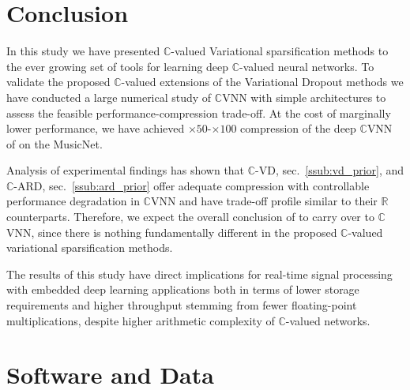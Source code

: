 \documentclass[a4paper,10pt,twocolumn]{article}
\newcommand{\real}{\mathbb{R}}
\newcommand{\cplx}{\mathbb{C}}
\begin{document}


\section{Conclusion} %
\label{sec:conclusion}

In this study we have presented $\cplx$-valued Variational sparsification methods to
the ever growing set of tools for learning deep $\cplx$-valued neural networks. To
validate the proposed $\cplx$-valued extensions of the Variational Dropout methods
\citep{molchanov_variational_2017,kharitonov_variational_2018} we have conducted a
large numerical study of $\cplx$VNN with simple architectures to assess the feasible
performance-compression trade-off. At the cost of marginally lower performance, we have
achieved $\times50$-$\times100$ compression of the deep $\cplx$VNN of \citet{trabelsi_deep_2018}
on the MusicNet.

Analysis of experimental findings has shown that $\cplx$-VD, sec.~\ref{ssub:vd_prior},
and $\cplx$-ARD, sec.~\ref{ssub:ard_prior} offer adequate compression with controllable
performance degradation in $\cplx$VNN and have trade-off profile similar to their $\real$
counterparts.
Therefore, we expect the overall conclusion of \citet{gale_state_2019} to carry over to
$\cplx$VNN, since there is nothing fundamentally different in the proposed $\cplx$-valued
variational sparsification methods.

The results of this study have direct implications for real-time signal processing with
embedded deep learning applications both in terms of lower storage requirements and higher
throughput stemming from fewer floating-point multiplications, despite higher arithmetic
complexity of $\cplx$-valued networks.


\section*{Software and Data} %
\label{sec:software_and_data}
\end{document}
